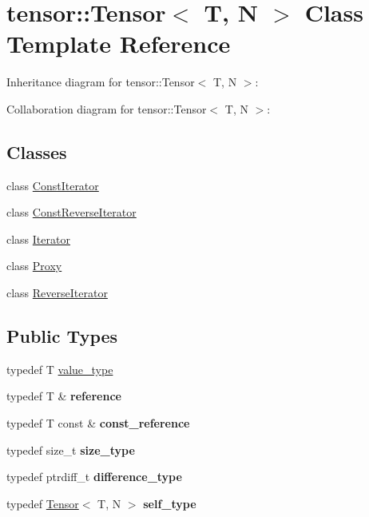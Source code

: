 \hypertarget{classtensor_1_1Tensor}{}\section{tensor\+:\+:Tensor$<$ T, N $>$ Class Template Reference}
\label{classtensor_1_1Tensor}


Inheritance diagram for tensor\+:\+:Tensor$<$ T, N $>$\+:


Collaboration diagram for tensor\+:\+:Tensor$<$ T, N $>$\+:
\subsection*{Classes}
\begin{DoxyCompactItemize}
\item 
class \hyperlink{classtensor_1_1Tensor_1_1ConstIterator}{Const\+Iterator}
\item 
class \hyperlink{classtensor_1_1Tensor_1_1ConstReverseIterator}{Const\+Reverse\+Iterator}
\item 
class \hyperlink{classtensor_1_1Tensor_1_1Iterator}{Iterator}
\item 
class \hyperlink{classtensor_1_1Tensor_1_1Proxy}{Proxy}
\item 
class \hyperlink{classtensor_1_1Tensor_1_1ReverseIterator}{Reverse\+Iterator}
\end{DoxyCompactItemize}
\subsection*{Public Types}
\begin{DoxyCompactItemize}
\item 
typedef T \hyperlink{classtensor_1_1Tensor_ad2bb23b5363bc4cdb97c43b48abb80f9}{value\+\_\+type}
\item 
typedef T \& {\bfseries reference}\hypertarget{classtensor_1_1Tensor_a0aadbaaa534281aa5394635be9323b8a}{}\label{classtensor_1_1Tensor_a0aadbaaa534281aa5394635be9323b8a}

\item 
typedef T const \& {\bfseries const\+\_\+reference}\hypertarget{classtensor_1_1Tensor_aea16565f8174f0b8a60c2a5fe1eda1e7}{}\label{classtensor_1_1Tensor_aea16565f8174f0b8a60c2a5fe1eda1e7}

\item 
typedef size\+\_\+t {\bfseries size\+\_\+type}\hypertarget{classtensor_1_1Tensor_ae1d6af038e05ae9cfa3d91162c2504de}{}\label{classtensor_1_1Tensor_ae1d6af038e05ae9cfa3d91162c2504de}

\item 
typedef ptrdiff\+\_\+t {\bfseries difference\+\_\+type}\hypertarget{classtensor_1_1Tensor_a491c6429ee1dafbd0d33e709868c6776}{}\label{classtensor_1_1Tensor_a491c6429ee1dafbd0d33e709868c6776}

\item 
typedef \hyperlink{classtensor_1_1Tensor}{Tensor}$<$ T, N $>$ {\bfseries self\+\_\+type}\hypertarget{classtensor_1_1Tensor_af377b68e264909b8c10d88674936f711}{}\label{classtensor_1_1Tensor_af377b68e264909b8c10d88674936f711}

\end{DoxyCompactItemize}
